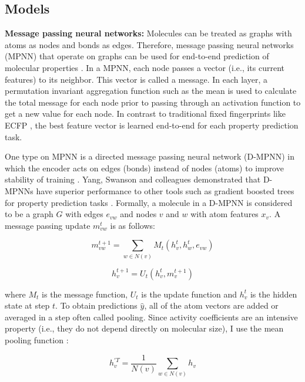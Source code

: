 \subsection{Models}

\noindent
\textbf{Message passing neural networks:} Molecules can be treated as graphs with atoms as nodes and bonds as edges. Therefore, message passing neural networks (MPNN) that operate on graphs can be used for end-to-end prediction of molecular properties \cite{Gilmer2017}.  In a MPNN, each node passes a vector (i.e., its current features) to its neighbor. This  vector is called a message. In each layer, a permutation invariant aggregation function such as the mean is used to calculate the total message for each node prior to passing through an activation function to get a new value for each node.  In contrast to traditional fixed fingerprints like ECFP \cite{Rogers2010}, the best feature vector is learned end-to-end for each property prediction task.

One type on MPNN is a directed message passing neural network (D-MPNN) in which the encoder acts on edges (bonds) instead of nodes (atoms) to improve stability of training \cite{Yang2019}. Yang, Swanson and colleagues demonstrated that D-MPNNs have superior performance to other tools such as gradient boosted trees for property prediction tasks \cite{Yang2019}. Formally, a molecule in a D-MPNN is considered to be a graph $G$ with edges $e_{vw}$ and nodes $v$ and $w$ with atom features $x_v$. A message passing update $m_{vw}^{t}$ is as follows:

\begin{equation}
    m_{vw}^{t+1} = \sum_{w\in N(v)} M_t(h_v^t, h_w^t, e_{vw})
\end{equation}

\begin{equation}
    h_v^{t+1} = U_t(h_v^t, m_v^{t+1})
\end{equation}

where $M_t$ is the message function, $U_t$ is the update function and $h_v^{t}$ is the hidden state at step $t$. To obtain predictions $\hat y$, all of the atom vectors are added or averaged in a step often called pooling. Since activity coefficients are an intensive property (i.e., they do not depend directly on molecular size), I use the mean pooling function \cite{Schweidtmann2023}:

\begin{equation}
    h_v^{'T} = \frac{1}{N(v)} \sum_{w\in N(v)} h_v
\end{equation}

